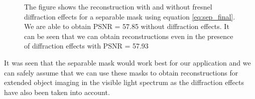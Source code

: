 \begin{figure}[ht]
\begin{subfigure}{0.5\textwidth}
    \end{subfigure}
    \caption{The figure shows the reconstruction with and without fresnel diffraction effects for a separable mask using equation \ref{eq:sep_final}. We are able to obtain PSNR = 57.85 without diffraction effects. It can be seen that we can obtain reconstructions even in the presence of diffraction effects with PSNR = 57.93 }
    \label{fig:rec_sep}
    \end{figure}
It was seen that the separable mask would work best for our application and we can safely assume that we can use these masks to obtain reconstructions for extended object imaging in the visible light spectrum as the diffraction effects have also been taken into account.     
    